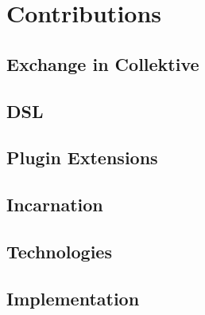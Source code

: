 
\chapter{Contributions}
\label{chap:contributions}

\section{Exchange in Collektive}
\section{DSL}
\section{Plugin Extensions}
\section{Incarnation}
\section{Technologies}
\section{Implementation}



%
%


